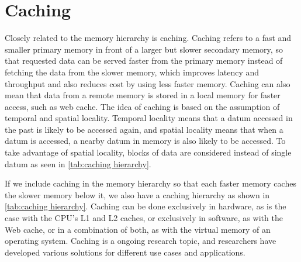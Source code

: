 \documentclass[
	12pt,
	a4paper,
	abstract,
	bibliography=totoc,
	chapterprefix,
	headings=openright,
	numbers=endperiod,
	parskip=half,
	twoside,
]{scrreprt}
\begin{document}
\section{Caching}
\label{sec:caching}

Closely related to the memory hierarchy is caching.
Caching refers to a fast and smaller primary memory in front of a larger but slower secondary memory, 
so that requested data can be served faster from the primary memory instead of fetching the data from the slower memory, 
which improves latency and throughput and also reduces cost by using less faster memory.
Caching can also mean that data from a remote memory is stored in a local memory for faster access, such as web cache.
The idea of caching is based on the assumption of temporal and spatial locality.
Temporal locality means that a datum accessed in the past is likely to be accessed again, and
spatial locality means that when a datum is accessed, a nearby datum in memory is also likely to be accessed.
To take advantage of spatial locality, blocks of data are considered instead of single datum as seen in \cref{tab:caching hierarchy}.

If we include caching in the memory hierarchy so that each faster memory caches the slower memory below it, 
we also have a caching hierarchy as shown in \cref{tab:caching hierarchy}.
Caching can be done exclusively in hardware, as is the case with the CPU's L1 and L2 caches, 
or exclusively in software, as with the Web cache, or in a combination of both, as with the virtual memory of an operating system.
Caching is a ongoing research topic, and researchers have developed various solutions for different use cases and applications.
\end{document}
